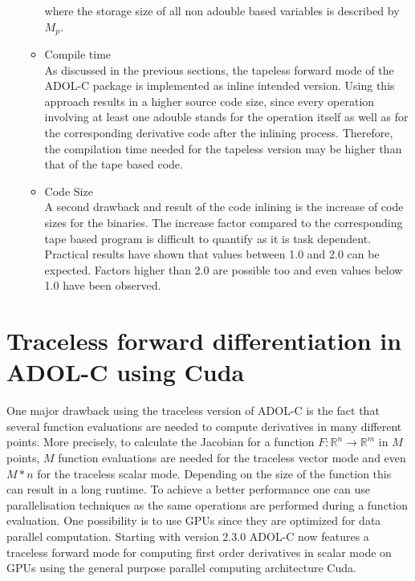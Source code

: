 \documentclass[11pt,twoside]{article}
\begin{document}
\begin{itemize}
\begin{itemize}
      where the storage size of all non {\sf adouble} based variables is described by $M_p$.
    \item Compile time\\
      As discussed in the previous sections, the tapeless forward mode of
      the ADOL-C package is implemented as inline intended version. Using
      this approach results in a higher source code size, since every
      operation involving at least one {\sf adouble} stands for the
      operation itself as well as for the corresponding derivative
      code after the inlining process. Therefore, the compilation time
      needed for the tapeless version may be higher than that of the tape based code. 
    \item Code Size\\
      A second drawback and result of the code inlining is the
      increase of code sizes for the binaries. The increase
      factor compared to the corresponding tape based program is
      difficult to quantify as it is task dependent. Practical results
      have shown that values between 1.0 and 2.0 can be
      expected. Factors higher than 2.0 are possible too and even
      values below 1.0 have been observed. 
    \end{itemize}
\end{itemize}


\section{Traceless forward differentiation in ADOL-C using Cuda}
\label{tracelessCuda}
%
One major drawback using the traceless version of ADOL-C is the fact 
that several function evaluations are needed to compute derivatives
in many different points. More precisely, to calculate the Jacobian for
a function $F:\mathbb{R}^n\rightarrow \mathbb{R}^m$ in $M$ points, $M$
function evaluations are needed for the traceless vector mode and even 
$M*n$ for the traceless scalar mode. Depending on the size of the function 
this can result in a long runtime. To achieve a better performance one can
use parallelisation techniques as the same operations are
performed during a function evaluation. One possibility is to use GPUs 
since they are optimized for data parallel computation. Starting with 
version 2.3.0 ADOL-C now features a traceless forward mode for computing 
first order derivatives in scalar mode on GPUs using the 
general purpose parallel computing architecture Cuda. 
\end{document}
